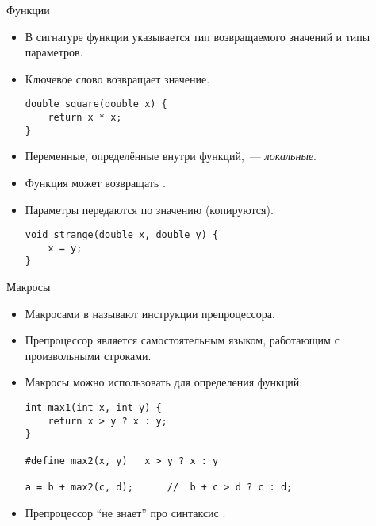 \documentclass[aspectration=1610,t]{beamer}
\begin{document}
\begin{frame}[fragile]{Функции}
\begin{itemize}
    \item В сигнатуре функции указывается тип возвращаемого значений и типы параметров.

    \item Ключевое слово  возвращает значение.
    \begin{lstlisting}
double square(double x) {
    return x * x;
}
    \end{lstlisting}

    \item Переменные, определённые внутри функций,~— {\em локальные}.
    
    \item Функция может возвращать .

    \item Параметры передаются по значению (копируются).

    \begin{lstlisting}
void strange(double x, double y) {
    x = y;
}
    \end{lstlisting}

\end{itemize}
\end{frame}

\begin{frame}[fragile]{Макросы}
\begin{itemize}
    \item Макросами в \langcpp называют инструкции препроцессора.

    \item Препроцессор \langcpp является самостоятельным языком,
        работающим с произвольными строками.

    \item Макросы можно использовать для определения функций:
    \begin{lstlisting}
int max1(int x, int y) { 
    return x > y ? x : y;
}

#define max2(x, y)   x > y ? x : y

a = b + max2(c, d);      //  b + c > d ? c : d;
    \end{lstlisting}

    \item Препроцессор ``не знает'' про синтаксис \langcpp.
    \end{itemize}
\end{frame}
\end{document}
